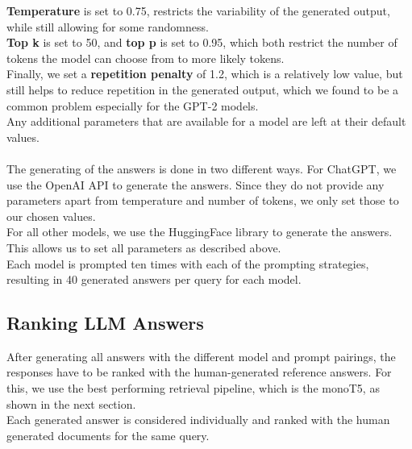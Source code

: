 \textbf{Temperature} is set to 0.75, restricts the variability of the generated output, while still allowing for some randomness.
\\
\textbf{Top k} is set to 50, and \textbf{top p} is set to 0.95, which both restrict the number of tokens the model can choose from to more likely tokens.
\\
Finally, we set a \textbf{repetition penalty} of 1.2, which is a relatively low value, but still helps to reduce repetition in the generated output, which we found to be a common problem especially for the GPT-2 models.
\\
Any additional parameters that are available for a model are left at their default values.
\\
\\
The generating of the answers is done in two different ways.
For ChatGPT, we use the OpenAI API to generate the answers.
Since they do not provide any parameters apart from temperature and number of tokens, we only set those to our chosen values.
\\
For all other models, we use the HuggingFace library to generate the answers.
This allows us to set all parameters as described above.
\\
Each model is prompted ten times with each of the prompting strategies, resulting in 40 generated answers per query for each model.


\subsection{Ranking LLM Answers}
After generating all answers with the different model and prompt pairings, the responses have to be ranked with the human-generated reference answers.
For this, we use the best performing retrieval pipeline, which is the monoT5, as shown in the next section.
\\
Each generated answer is considered individually and ranked with the human generated documents for the same query.
\\
